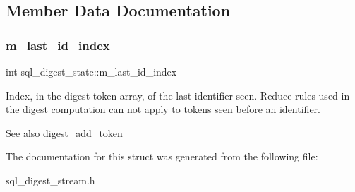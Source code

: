 \subsection{Member Data Documentation}
\mbox{\label{structsql__digest__state_ae16b2c8bbc75b4de6a3a98bf5ec9a6d6}} 
\subsubsection{\texorpdfstring{m\+\_\+last\+\_\+id\+\_\+index}{m\_last\_id\_index}}
{\footnotesize\ttfamily int sql\+\_\+digest\+\_\+state\+::m\+\_\+last\+\_\+id\+\_\+index}

Index, in the digest token array, of the last identifier seen. Reduce rules used in the digest computation can not apply to tokens seen before an identifier. \begin{DoxySeeAlso}{See also}
digest\+\_\+add\+\_\+token 
\end{DoxySeeAlso}


The documentation for this struct was generated from the following file\+:\begin{DoxyCompactItemize}
\item 
sql\+\_\+digest\+\_\+stream.\+h\end{DoxyCompactItemize}
